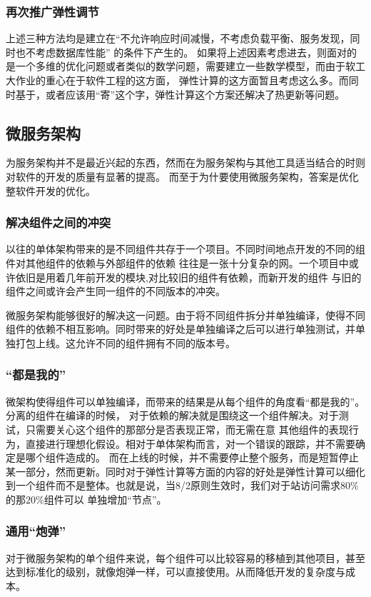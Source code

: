 \subsubsection{再次推广弹性调节}
上述三种方法均是建立在“不允许响应时间减慢，不考虑负载平衡、服务发现，同时也不考虑数据库性能” 的条件下产生的。
如果将上述因素考虑进去，则面对的是一个多维的优化问题或者类似的数学问题，需要建立一些数学模型，而由于软工大作业的重心在于软件工程的这方面，
弹性计算的这方面暂且考虑这么多。而同时基于，或者应该用“寄”这个字，弹性计算这个方案还解决了热更新等问题。

\subsection{微服务架构}
为服务架构并不是最近兴起的东西，然而在为服务架构与其他工具适当结合的时则对软件的开发的质量有显著的提高。
而至于为什要使用微服务架构，答案是优化整软件开发的优化。

\subsubsection{解决组件之间的冲突}
以往的单体架构带来的是不同组件共存于一个项目。不同时间地点开发的不同的组件对其他组件的依赖与外部组件的依赖
往往是一张十分复杂的网。一个项目中或许依旧是用着几年前开发的模块,对比较旧的组件有依赖，而新开发的组件
与旧的组件之间或许会产生同一组件的不同版本的冲突。

微服务架构能够很好的解决这一问题。由于将不同组件拆分并单独编译，使得不同组件的依赖不相互影响。同时带来的好处是单独编译之后可以进行单独测试，并单独打包上线。这允许不同的组件拥有不同的版本号。

\subsubsection{“都是我的”}
微架构使得组件可以单独编译，而带来的结果是从每个组件的角度看“都是我的”。分离的组件在编译的时候，
对于依赖的解决就是围绕这一个组件解决。对于测试，只需要关心这个组件的那部分是否表现正常，而无需在意
其他组件的表现行为，直接进行理想化假设。相对于单体架构而言，对一个错误的跟踪，并不需要确定是哪个组件造成的。
而在上线的时候，并不需要停止整个服务，而是短暂停止某一部分，然而更新。同时对于弹性计算等方面的内容的好处是弹性计算可以细化到一个组件而不是整体。也就是说，当8/2原则生效时，我们对于站访问需求$80\%$的那$20\%$组件可以
单独增加“节点”。

\subsubsection{通用“炮弹”}
对于微服务架构的单个组件来说，每个组件可以比较容易的移植到其他项目，甚至达到标准化的级别，就像炮弹一样，可以直接使用。从而降低开发的复杂度与成本。

